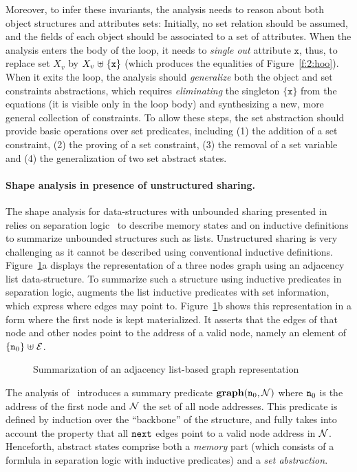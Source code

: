 Moreover, to infer these invariants, the analysis needs to reason
about both object structures and attributes sets:
Initially, no set relation should be assumed, and the fields of
  each object should be associated to a set of attributes.
When the analysis enters the body of the loop, it needs to
  {\em single out} attribute \( \mathtt{x} \), thus, to replace set
  \( X_v \) by \( X_v \mathrel{\uplus} \{ \mathtt{x} \} \) (which produces the
  equalities of Figure~\ref{f:2:hoo}).
When it exits the loop, the analysis should {\em generalize}
  both the object and set constraints abstractions, which requires
   {\em eliminating} the singleton \( \{ \mathtt{x} \} \) from the
  equations (it is visible only in the loop body) and synthesizing
  a new, more general collection of constraints.
To allow these steps, the set abstraction should provide basic operations
over set predicates, including (1) the addition of a set constraint, (2)
the proving of a set constraint, (3) the removal of a set variable and
(4) the generalization of two set abstract states.

\paragraph{Shape analysis in presence of unstructured sharing.}
The shape analysis for data-structures with unbounded sharing presented
in~\cite{memcad:15:sas} relies on separation logic~\cite{r:lics:02} to
describe memory states and on inductive definitions to summarize
unbounded structures such as lists.
Unstructured sharing is very challenging as it cannot be described using
conventional inductive definitions.
Figure~\ref{f:3:memcad}a displays the representation of a three nodes
graph using an adjacency list data-structure.
To summarize such a structure using inductive predicates in separation
logic, \cite{memcad:15:sas} augments the list inductive
predicates with set information, which express where edges may point to.
Figure~\ref{f:3:memcad}b shows this representation in
a form where the first node is kept materialized.
It asserts that the edges of that node and other nodes
point to the address of a valid node, namely an element of \( \{ \texttt{n}_{0}
\} \mathrel{\uplus} \mathcal{E} \).
\begin{figure}[t]
  \newcommand{\picscale}{0.9}
  \tikzpics{\picscale}{memcad-inv}
  \caption{Summarization of an adjacency list-based graph representation}
  \label{f:3:memcad}
\end{figure}
The analysis of~\cite{memcad:15:sas} introduces a summary predicate
\( \textbf{graph}( \texttt{n}_{0}, \mathcal{N} ) \) where \( \texttt{n}_{0} \) is the
address of the first node and \( \mathcal{N} \) the set of all node addresses.
This predicate is defined by induction over the ``backbone'' of the
structure, and fully takes into account the property that all
\( \mathtt{next} \) edges point to a valid node address in \( \mathcal{N} \).
Henceforth, abstract states comprise both a {\em memory} part (which
consists of a formlula in separation logic with inductive predicates)
and a {\em set abstraction}.

